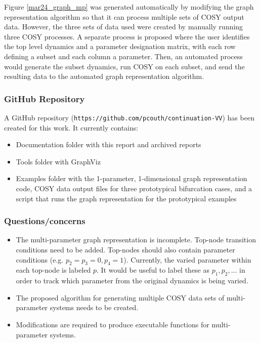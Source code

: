 \documentclass[12pt]{article}
\begin{document}
Figure \ref{mar24_graph_mp} was generated automatically by modifying the graph representation algorithm so that it can process multiple sets of COSY output data. However, the three sets of data used were created by manually running three COSY processes. A separate process is proposed where the user identifies the top level dynamics and a parameter designation matrix, with each row defining a subset and each column a parameter. Then, an automated process would generate the subset dynamics, run COSY on each subset, and send the resulting data to the automated graph representation algorithm.


\subsubsection{GitHub Repository}
A GitHub repository (\texttt{https://github.com/pcouth/continuation-VV}) has been created for this work. It currently contains:

\begin{itemize}
\item Documentation folder with this report and archived reports
\item Tools folder with GraphViz
\item Examples folder with the 1-parameter, 1-dimensional graph representation code, COSY data output files for three prototypical bifurcation cases, and a script that runs the graph representation for the prototypical examples
\end{itemize}


\subsubsection{Questions/concerns}
\label{mar24q}
\begin{itemize}
\item The multi-parameter graph representation is incomplete. Top-node transition conditions need to be added. Top-nodes should also contain parameter conditions (e.g. $p_2=p_3=0, p_4=1$). Currently, the varied parameter within each top-node is labeled $p$. It would be useful to label these as $p_1,p_2,...$ in order to track which parameter from the original dynamics is being varied.
\item The proposed algorithm for generating multiple COSY data sets of multi-parameter systems needs to be created.
\item Modifications are required to produce executable functions for multi-parameter systems.
\end{itemize}
\end{document}

